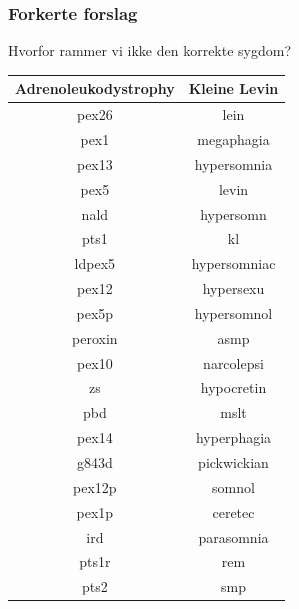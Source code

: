 \documentclass[xcolor=table]{beamer}
\begin{document}
\begin{frame}

  \frametitle{Forkerte forslag}

  Hvorfor rammer vi ikke den korrekte sygdom?

  \begin{table}[H]
    \begin{tiny}
      \begin{center}
        \begin{tabular}{|c|c|}
          \hline
          \scriptsize{\textbf{Adrenoleukodystrophy}} & \scriptsize{\textbf{Kleine Levin}} \\
          \hline
          pex26 &lein  \\
          \hline
          pex1 &megaphagia \\
          \hline
          pex13 &hypersomnia\\
          \hline
          pex5 &levin\\
          \hline
          nald &hypersomn\\
          \hline
          pts1 &kl\\
          \hline
          ldpex5 &hypersomniac\\
          \hline
          pex12 &hypersexu \\
          \hline
          pex5p &hypersomnol\\
          \hline
          peroxin&asmp \\
          \hline
          pex10 &narcolepsi\\
          \hline
          zs &hypocretin\\
          \hline
          pbd &mslt \\
          \hline
          pex14 &hyperphagia\\
          \hline
          g843d &pickwickian \\
          \hline
          pex12p &somnol\\
          \hline
          pex1p &ceretec\\
          \hline
          ird &parasomnia\\
          \hline
          pts1r &rem\\
          \hline
          pts2 &smp\\
          \hline
        \end{tabular}
      \end{center}
    \end{tiny}
  \end{table}
  
\end{frame}
\end{document}
